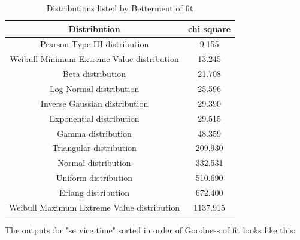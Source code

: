 \documentclass{article}
\begin{document}

\begin{table}[H]
    \caption{Distributions listed by Betterment of fit}
    \label{tab:Inter-arrival Best Fit}
    \begin{center}
    \begin{tabular}{c S}
        \toprule
        \textbf{Distribution} & \textbf{chi square}\\
        \midrule
        Pearson Type III distribution & 9.155\\
        Weibull Minimum Extreme Value distribution & 13.245\\
        Beta distribution & 21.708\\
        Log Normal distribution & 25.596\\
        Inverse Gaussian distribution & 29.390\\
        Exponential distribution & 29.515\\
        Gamma distribution & 48.359\\
        Triangular distribution & 209.930\\
        Normal distribution & 332.531\\
        Uniform distribution & 510.690\\
        Erlang distribution & 672.400\\
        Weibull Maximum Extreme Value distribution & 1137.915\\
        \bottomrule
    \end{tabular}
    \end{center}
\end{table}

The outputs for "service time" sorted in order of Goodness of fit looks like this:
\end{document}
